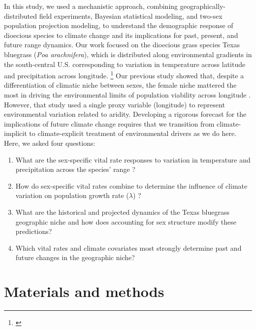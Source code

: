 \documentclass[12pt]{article}
\newcommand{\tom}[2]{{\color{red}{#1}}\footnote{\textit{\color{red}{#2}}}}
\begin{document}
In this study, we used a mechanistic approach, combining geographically-distributed field experiments, Bayesian statistical modeling, and two-sex population projection modeling, to understand the demographic response of dioecious species to climate change and its implications for past, present, and future range dynamics. 
Our work focused on the dioecious grass species Texas bluegrass (\textit{Poa arachnifera}), which is distributed along environmental gradients in the south-central U.S. corresponding to variation in temperature across latitude and precipitation across longitude. 
\tom{}{I think it would be good to add some context about climate change in this study region -- what has already occurred and what is projected.}
Our previous study showed that, despite a differentiation of climatic niche between sexes, the female niche mattered the most in driving the environmental limits of population viability across longitude \citep{miller2022two}. 
However, that study used a single proxy variable (longitude) to represent environmental variation related to aridity. 
Developing a rigorous forecast for the implications of future climate change requires that we transition from climate-implicit to climate-explicit treatment of environmental drivers as we do here.
Here, we asked four questions: 
\begin{enumerate}
	\item What are the sex-specific vital rate responses to variation in temperature and precipitation across the species' range ?
	\item How do sex-specific vital rates combine to determine the influence of climate variation on population growth rate ($\lambda$) ?
	\item What are the historical and projected dynamics of the Texas bluegrass geographic niche and how does accounting for sex structure modify these predictions?
	\item Which vital rates and climate covariates most strongly determine past and future changes in the geographic niche?
\end{enumerate}

\section*{Materials and methods}
\end{document}
